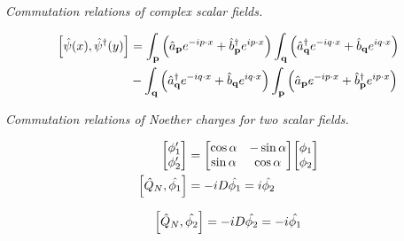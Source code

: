 \documentclass{report}
\begin{document}
\begin{subquests}
	\item \emph{Commutation relations of complex scalar fields.}
	\begin{subquests}
		\item
		\begin{align*}
			\bqty{\hat{\psi}(x),\hat{\psi}^{\dagger}(y)} & = \int_{\mathbf p} \pqty{\hat{a}_{\vb p}e^{-i p \cdot x} + \hat{b}^{\dagger}_{\vb p}e^{i p \cdot x}}\int_{\mathbf q}\pqty{\hat{a}^{\dagger}_{\vb q}e^{-i q \cdot x} + \hat{b}_{\vb q}e^{i q \cdot x}} \\
			& - \int_{\mathbf q}\pqty{\hat{a}^{\dagger}_{\vb q}e^{-i q \cdot x} + \hat{b}_{\vb q}e^{i q \cdot x}}		\int_{\mathbf p} \pqty{\hat{a}_{\vb p}e^{-i p \cdot x} + \hat{b}^{\dagger}_{\vb p}e^{i p \cdot x}}
		\end{align*}

		\item

	\end{subquests}
	
	\item \emph{Commutation relations of Noether charges for two scalar fields.}
	\begin{subquests}
		\item
		\begin{align*}
			\mqty[
				\phi_1' \\
				\phi_2' 
			]
			& = \mqty[
				\cos\alpha & -\sin\alpha \\
				\sin\alpha & \cos\alpha \\
			]\mqty[
				\phi_1 \\
				\phi_2
			] \\
			\bqty{\hat{Q}_N, \hat{\phi_1}} & = -iD\hat{\phi_1} = i\hat{\phi_2}
		\end{align*}

		\item
		\begin{gather*}
			\bqty{\hat{Q}_N, \hat{\phi_2}} = -iD\hat{\phi_2} = -i\hat{\phi_1}
		\end{gather*}
		

\end{subquests}
\end{subquests}
\end{document}
